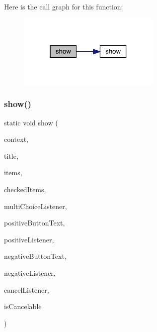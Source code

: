 Here is the call graph for this function\+:
\nopagebreak
\begin{figure}[H]
\begin{center}
\leavevmode
\includegraphics[width=195pt]{classcom_1_1toast_1_1android_1_1gamebase_1_1base_1_1ui_1_1_simple_multi_choice_dialog_a86ac518b83d512f55746c77621d72ed9_cgraph}
\end{center}
\end{figure}
\mbox{\label{classcom_1_1toast_1_1android_1_1gamebase_1_1base_1_1ui_1_1_simple_multi_choice_dialog_a745dc96ff167c04d04d6ceee8a73a6b1}} 
\subsubsection{\texorpdfstring{show()}{show()}\hspace{0.1cm}{\footnotesize\ttfamily [3/3]}}
{\footnotesize\ttfamily static void show (\begin{DoxyParamCaption}\item[{@Non\+Null final Context}]{context,  }\item[{@Non\+Null final String}]{title,  }\item[{@Non\+Null final Char\+Sequence \mbox{[}$\,$\mbox{]}}]{items,  }\item[{@Nullable final boolean \mbox{[}$\,$\mbox{]}}]{checked\+Items,  }\item[{@Nullable final Dialog\+Interface.\+On\+Multi\+Choice\+Click\+Listener}]{multi\+Choice\+Listener,  }\item[{@Nullable final String}]{positive\+Button\+Text,  }\item[{@Nullable final Dialog\+Interface.\+On\+Click\+Listener}]{positive\+Listener,  }\item[{@Nullable final String}]{negative\+Button\+Text,  }\item[{@Nullable final Dialog\+Interface.\+On\+Click\+Listener}]{negative\+Listener,  }\item[{@Nullable final Dialog\+Interface.\+On\+Cancel\+Listener}]{cancel\+Listener,  }\item[{final boolean}]{is\+Cancelable }\end{DoxyParamCaption})\hspace{0.3cm}{\ttfamily [static]}}


